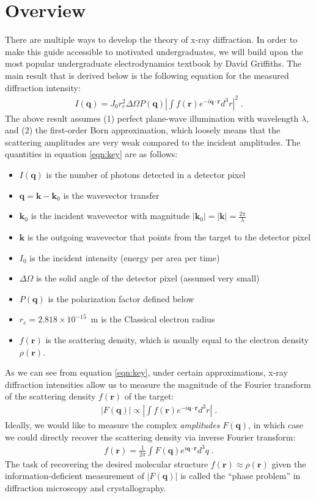 \documentclass[12pt]{article}
\renewcommand{\vec}[1]{\boldsymbol{#1}}
\newcommand{\abs}[1]{\left| #1 \right|}
\begin{document}
\section{Overview}


There are multiple ways to develop the theory of x-ray diffraction.  In order to make this guide 
accessible to motivated undergraduates, we will build upon the most popular
undergraduate electrodynamics textbook by David Griffiths.  The main result that is 
derived below is the following equation for the measured diffraction intensity:
\begin{align}\label{eqn:key}
    I(\vec{q}) = J_0 r_e^2 \Delta \Omega P(\vec{q})  \abs{\int  f(\vec{r}) e^{-i \vec{q}\cdot\vec{r}} d^3 r }^2 \;.
\end{align}
The above result assumes (1) perfect plane-wave illumination with wavelength $\lambda$,
and (2) the first-order Born approximation, which loosely means that the scattering amplitudes are very weak 
compared to the incident amplitudes.
The quantities in equation \ref{eqn:key} are as follows:
\begin{itemize}
\item $I(\vec{q})$ is the number of photons detected in a detector pixel
\item $\vec{q}=\vec{k}-\vec{k}_0$ is the wavevector transfer
\item $\vec{k}_0$ is the incident wavevector with magnitude $|\vec{k}_0| = |\vec{k}| = \frac{2\pi}{\lambda}$
\item $\vec{k}$ is the outgoing wavevector that points from the target to the detector pixel
\item $I_0$ is the incident intensity (energy per area per time)
\item $\Delta \Omega$ is the solid angle of the detector pixel (assumed very small)
\item $P(\vec{q})$ is the polarization factor defined below
\item $r_e = 2.818 \times 10^{-15}$~m is the Classical electron radius
\item $f(\vec{r})$ is the scattering density, which is usually equal to the electron density $\rho(\vec{r})$.
\end{itemize}

As we can see from equation \ref{eqn:key}, under certain approximations, x-ray diffraction intensities 
allow us to measure the magnitude of the Fourier transform of the scattering density $f(\vec{r})$ of the target:
\begin{align}
    \abs{F(\vec{q})} \propto \abs{\int  f(\vec{r}) e^{-i \vec{q}\cdot\vec{r}} d^3 r } \;.
\end{align}
Ideally, we would like to measure the complex \emph{amplitudes} $F(\vec{q})$, in which case
we could directly recover the scattering density via inverse Fourier transform:
\begin{align}
f(\vec{r}) = \frac{1}{2\pi} \int  F(\vec{q}) e^{i \vec{q}\cdot\vec{r}} d^3 q \;.
\end{align}
The task of recovering the desired molecular structure $f(\vec{r})\approx \rho(\vec{r})$ given the 
information-deficient
measurement of $\abs{F(\vec{q})}$ is called the ``phase problem'' in diffraction microscopy and
crystallography.
\end{document}
